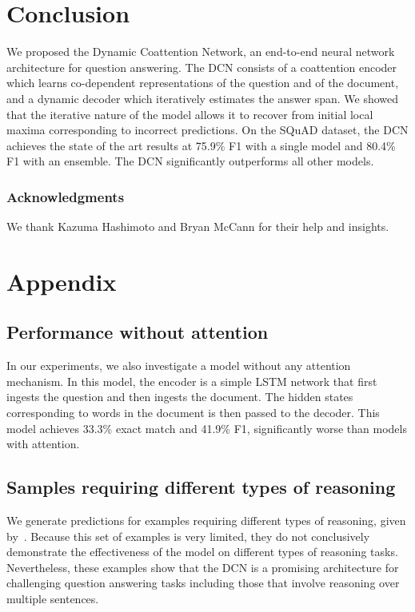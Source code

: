 \documentclass{article} \usepackage{iclr2017_conference,times}
\newcommand{\squad}{SQuAD\xspace}
\newcommand{\ours}{DCN\xspace}
\newcommand{\oursfull}{Dynamic Coattention Network\xspace}
\newcommand{\testf}{80.4}
\newcommand{\testfsingle}{75.9}
\begin{document}
\section{Conclusion}

We proposed the \oursfull, an end-to-end neural network architecture for question answering.
The \ours consists of a coattention encoder which learns co-dependent representations of the question and of the document, and a dynamic decoder which iteratively estimates the answer span.
We showed that the iterative nature of the model allows it to recover from initial local maxima corresponding to incorrect predictions.
On the \squad dataset, the \ours achieves the state of the art results at \testfsingle\% F1 with a single model and \testf\% F1 with an ensemble. 
The \ours significantly outperforms all other models.


\subsubsection*{Acknowledgments}

We thank Kazuma Hashimoto and Bryan McCann for their help and insights.






\clearpage{}\appendix
\section{Appendix}


\subsection{Performance without attention}

In our experiments, we also investigate a model without any attention mechanism.
In this model, the encoder is a simple LSTM network that first ingests the question and then ingests the document.
The hidden states corresponding to words in the document is then passed to the decoder.
This model achieves 33.3\% exact match and 41.9\% F1, significantly worse than models with attention.


\subsection{Samples requiring different types of reasoning}

We generate predictions for examples requiring different types of reasoning, given by~\cite{rajpurkar2016squad}.
Because this set of examples is very limited, they do not conclusively demonstrate the effectiveness of the model on different types of reasoning tasks.
Nevertheless, these examples show that the \ours is a promising architecture for challenging question answering tasks including those that involve reasoning over multiple sentences.
\end{document}
